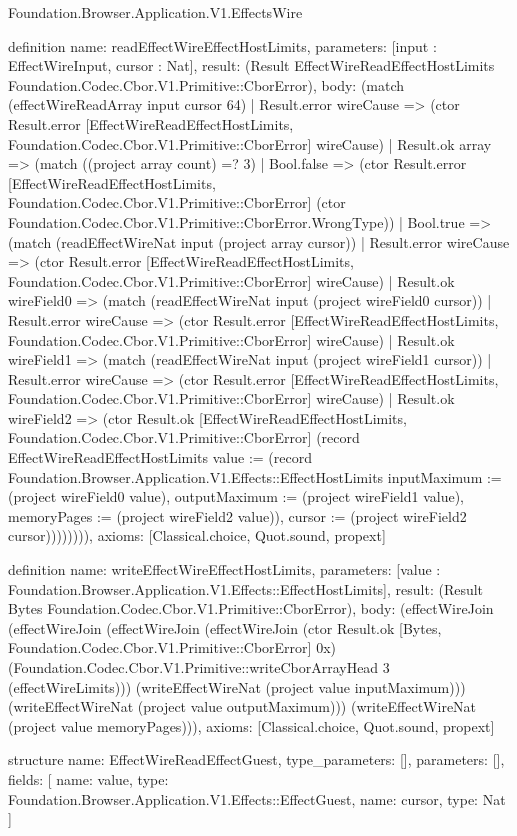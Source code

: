 \begin{lexlean}{Foundation.Browser.Application.V1.EffectsWire}
\begin{semanticmodule}
definition{
  name: readEffectWireEffectHostLimits,
  parameters: [input : EffectWireInput, cursor : Nat],
  result: (Result EffectWireReadEffectHostLimits Foundation.Codec.Cbor.V1.Primitive::CborError),
  body: (match (effectWireReadArray input cursor 64)
    | Result.error wireCause => (ctor Result.error [EffectWireReadEffectHostLimits, Foundation.Codec.Cbor.V1.Primitive::CborError] wireCause)
    | Result.ok array => (match ((project array count) =? 3)
      | Bool.false => (ctor Result.error [EffectWireReadEffectHostLimits, Foundation.Codec.Cbor.V1.Primitive::CborError] (ctor Foundation.Codec.Cbor.V1.Primitive::CborError.WrongType))
      | Bool.true => (match (readEffectWireNat input (project array cursor))
        | Result.error wireCause => (ctor Result.error [EffectWireReadEffectHostLimits, Foundation.Codec.Cbor.V1.Primitive::CborError] wireCause)
        | Result.ok wireField0 => (match (readEffectWireNat input (project wireField0 cursor))
          | Result.error wireCause => (ctor Result.error [EffectWireReadEffectHostLimits, Foundation.Codec.Cbor.V1.Primitive::CborError] wireCause)
          | Result.ok wireField1 => (match (readEffectWireNat input (project wireField1 cursor))
            | Result.error wireCause => (ctor Result.error [EffectWireReadEffectHostLimits, Foundation.Codec.Cbor.V1.Primitive::CborError] wireCause)
            | Result.ok wireField2 => (ctor Result.ok [EffectWireReadEffectHostLimits, Foundation.Codec.Cbor.V1.Primitive::CborError] (record EffectWireReadEffectHostLimits {value := (record Foundation.Browser.Application.V1.Effects::EffectHostLimits {inputMaximum := (project wireField0 value), outputMaximum := (project wireField1 value), memoryPages := (project wireField2 value)}), cursor := (project wireField2 cursor)}))))))),
  axioms: [Classical.choice, Quot.sound, propext]
}

definition{
  name: writeEffectWireEffectHostLimits,
  parameters: [value : Foundation.Browser.Application.V1.Effects::EffectHostLimits],
  result: (Result Bytes Foundation.Codec.Cbor.V1.Primitive::CborError),
  body: (effectWireJoin (effectWireJoin (effectWireJoin (effectWireJoin (ctor Result.ok [Bytes, Foundation.Codec.Cbor.V1.Primitive::CborError] 0x) (Foundation.Codec.Cbor.V1.Primitive::writeCborArrayHead 3 (effectWireLimits))) (writeEffectWireNat (project value inputMaximum))) (writeEffectWireNat (project value outputMaximum))) (writeEffectWireNat (project value memoryPages))),
  axioms: [Classical.choice, Quot.sound, propext]
}

structure{
  name: EffectWireReadEffectGuest,
  type_parameters: [],
  parameters: [],
  fields: [
    {name: value, type: Foundation.Browser.Application.V1.Effects::EffectGuest},
    {name: cursor, type: Nat}
  ]
}


\end{semanticmodule}
\end{lexlean}
